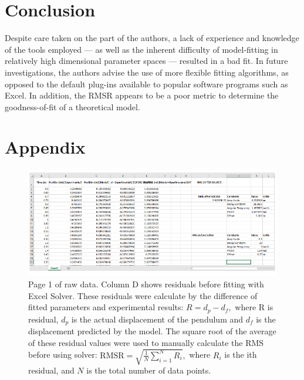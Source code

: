 \documentclass{article}
\begin{document}
  \section{Conclusion}

  Despite care taken on the part of the authors, a lack of experience and knowledge of the tools employed --- as well as the inherent difficulty of model-fitting in relatively high dimensional parameter spaces --- resulted in a bad fit. In future investigations, the authors advise the use of more flexible fitting algorithms, as opposed to the default plug-ins available to popular software programs such as Excel. In addition, the RMSR appears to be a poor metric to determine the goodness-of-fit of a theoretical model.

  \clearpage

  \section{Appendix}

    \begin{figure}[!ht]
      \centering
      \includegraphics[scale=.6]{raw_data.png}
      \caption{Page 1 of raw data. Column D shows residuals before fitting with Excel Solver. These residuals were calculate by the difference of fitted parameters and experimental results: $R = d_p - d_f,$ where  R is residual, $d_p$ is the actual displacement of the pendulum and $d_f$ is the displacement predicted by the model. The square root of the average of these residual values were used to manually calculate the RMS before using solver: $\text{RMSR} = \sqrt{\frac{1}{N} \sum\limits_{i=1}^N R_i},$ where $R_i$ is the ith residual, and $N$ is the total number of data points.}
      \label{raw}
    \end{figure}
\end{document}
